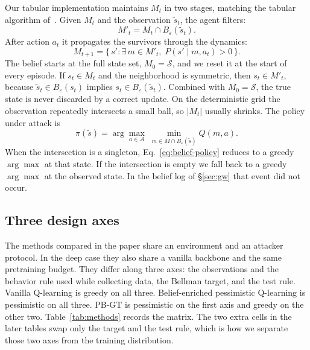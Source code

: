 \documentclass[10pt,twocolumn]{article}
\begin{document}
Our tabular implementation maintains $M_t$ in two stages, matching the tabular algorithm of~\cite{sun2024belief}.
Given $M_t$ and the observation $\tilde s_t$, the agent filters:
\begin{equation}
M'_t = M_t \cap B_\varepsilon(\tilde s_t).
\label{eq:belief-filter}
\end{equation}
After action $a_t$ it propagates the survivors through the dynamics:
\begin{equation}
M_{t+1} = \bigl\{\,s' : \exists\, m\in M'_t,\; P(s'\mid m,a_t)>0 \,\bigr\}.
\label{eq:belief}
\end{equation}
The belief starts at the full state set, $M_0=\mathcal{S}$, and we reset it at the start of every episode.
If $s_t\in M_t$ and the neighborhood is symmetric, then $s_t\in M'_t$, because $\tilde s_t\in B_\varepsilon(s_t)$ implies $s_t\in B_\varepsilon(\tilde s_t)$.
Combined with $M_0=\mathcal{S}$, the true state is never discarded by a correct update.
On the deterministic grid the observation repeatedly intersects a small ball, so $|M_t|$ usually shrinks.
The policy under attack is
\begin{equation}
\pi(\tilde s)=\arg\max_{a\in\mathcal{A}}\;\min_{m\in M \cap B_\varepsilon(\tilde s)} Q(m,a).
\label{eq:belief-policy}
\end{equation}
When the intersection is a singleton, Eq.~\eqref{eq:belief-policy} reduces to a greedy $\arg\max$ at that state.
If the intersection is empty we fall back to a greedy $\arg\max$ at the observed state.
In the belief log of \S\ref{sec:gw} that event did not occur.

\subsection{Three design axes}
\label{sec:methods}

The methods compared in the paper share an environment and an attacker protocol.
In the deep case they also share a vanilla backbone and the same pretraining budget.
They differ along three axes: the observations and the behavior rule used while collecting data, the Bellman target, and the test rule.
Vanilla Q-learning is greedy on all three.
Belief-enriched pessimistic Q-learning is pessimistic on all three.
PB-GT is pessimistic on the first axis and greedy on the other two.
Table~\ref{tab:methods} records the matrix.
The two extra cells in the later tables swap only the target and the test rule, which is how we separate those two axes from the training distribution.
\end{document}
